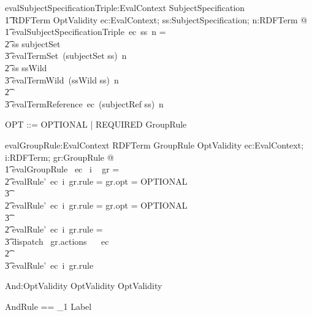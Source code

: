 \begin{gendef}
   evalSubjectSpecificationTriple:EvalContext \fun SubjectSpecification \fun \\
\t1 RDFTerm \fun OptValidity
\where
   \forall ec:EvalContext; ss:SubjectSpecification; n:RDFTerm @ \\
\t1	evalSubjectSpecificationTriple~ec~ss~n = \\
\t2 	\IF ss \in \ran subjectSet \THEN \\
\t3 		evalTermSet~(subjectSet \entryFor ss)~n \\
\t2 	\ELSE \IF ss \in \ran ssWild \THEN \\
\t3 		evalTermWild~(ssWild \entryFor ss)~n \\
\t2 	\ELSE \\
\t3 		evalTermReference~ec~(subjectRef \entryFor ss)~n
\end{gendef}
			

\begin{zed}
OPT ::= OPTIONAL | REQUIRED
\also
GroupRule  \\
\end{zed}
		

\begin{gendef}
   evalGroupRule:EvalContext \fun RDFTerm \fun GroupRule \fun OptValidity
\where
\forall ec:EvalContext; i:RDFTerm; gr:GroupRule @ \\
\t1	evalGroupRule~ ec~ i ~ gr = \\
\t2 	\IF evalRule'~ec~i~gr.rule = \none \land gr.opt = OPTIONAL \\
\t3 	\THEN \nomatch \\
\t2 	\ELSE \IF evalRule'~ec~i~gr.rule = \error \land gr.opt = OPTIONAL \\
\t3 	\THEN \fail \\
\t2 	\ELSE \IF evalRule'~ec~i~gr.rule = \pass \\
\t3 	\THEN dispatch~ gr.actions~ \emptyset ~ ec \\
\t2 	\ELSE \\
\t3			evalRule'~ec~i~gr.rule
\end{gendef}
		

\begin{gendef}
   And:OptValidity \fun OptValidity \fun OptValidity
\end{gendef}
		

\begin{zed}
AndRule == \seq_1 Label
\end{zed}
		


